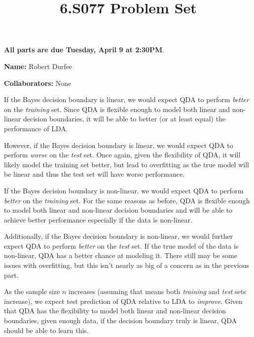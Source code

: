 \documentclass[12pt,twoside]{article}
\title{6.S077 Problem Set \theproblemsetnum}
\newcommand{\theproblemsetnum}{6}
\newcommand{\releasedate}{Tuesday, March 19}
\newcommand{\partaduedate}{Tuesday, April 9}
\begin{document}
\handout{Problem Set \theproblemsetnum}{\releasedate}
\textbf{All parts are due {\bf \partaduedate} at {\bf 2:30PM}}.

\setlength{\parindent}{0pt}
\medskip\hrulefill\medskip

{\bf Name:} Robert Durfee

\medskip

{\bf Collaborators:} None

\medskip\hrulefill

\begin{problems}

\problem  %

\begin{problemparts}

\problempart %

If the Bayes decision boundary is linear, we would expect QDA to perform
{\it better} on the {\it training} set. Since QDA is flexible enough to model
both linear and non-linear decision boundaries, it will be able to better (or
at least equal) the performance of LDA.

However, if the Bayes decision boundary is linear, we would expect QDA to
perform {\it worse} on the {\it test} set. Once again, given the flexibility
of QDA, it will likely model the training set better, but lead to overfitting
as the true model will be linear and thus the test set will have worse
performance.

\problempart %

If the Bayes decision boundary is non-linear, we would expect QDA to perform
{\it better} on the {\it training} set. For the same reasons as before, QDA
is flexible enough to model both linear and non-linear decision boundaries
and will be able to achieve better performance especially if the data is
non-linear.

Additionally, if the Bayes decision boundary is non-linear, we would further
expect QDA to perform {\it better} on the {\it test} set. If the true model
of the data is non-linear, QDA has a better chance at modeling it. There
still may be some issues with overfitting, but this isn't nearly as big of a
concern as in the previous part.

\problempart %

As the sample size $n$ increases (assuming that means both {\it training} and
{\it test} sets increase), we expect test prediction of QDA relative to LDA
to {\it improve}. Given that QDA has the flexibility to model both linear and
non-linear decision boundaries, given enough data, if the decision boundary
truly is linear, QDA should be able to learn this.


\end{problemparts}
\end{problems}
\end{document}

